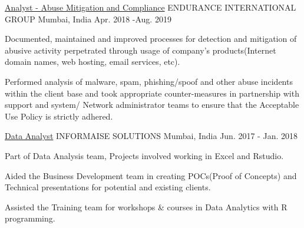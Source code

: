 


\begin{cventries}



\cventry
{\underline {Analyst - Abuse Mitigation and Compliance}} %
{ENDURANCE INTERNATIONAL GROUP} %
{Mumbai, India} %
{Apr. 2018 -Aug. 2019} %
{ %
\begin{cvitems}
\item{Documented, maintained and improved processes for detection and mitigation of
abusive activity perpetrated through usage of company's products(Internet domain names, web hosting, email services, etc).}
\item{Performed analysis of malware, spam, phishing/spoof and other abuse incidents within the client base and took appropriate counter-measures in partnership with support and system/ Network administrator teams to ensure that the Acceptable Use Policy is strictly adhered.}
\end{cvitems}
\vspace{-1.5\baselineskip} 
}


\cventry
{\underline {Data Analyst}} %
{INFORMAISE SOLUTIONS} %
{Mumbai, India} %
{Jun. 2017 - Jan. 2018} %
{ %
\begin{cvitems}
\item{Part of Data Analysis team, Projects involved working in Excel and Rstudio.}
\item{Aided the Business Development team in creating POCs(Proof of Concepts) and Technical presentations for potential and existing clients.}
\item{ Assisted the Training team for workshops \& courses in Data Analytics with R programming.}
\end{cvitems}
\vspace{-1.5\baselineskip} 
}


\end{cventries}
